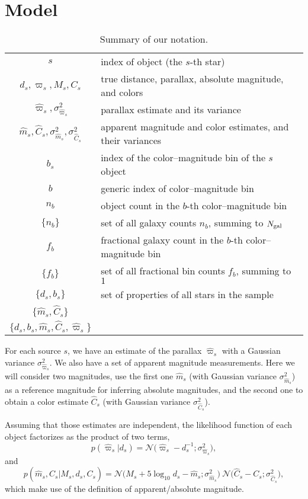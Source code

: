 \documentclass[aps,prd,showpacs,superscriptaddress,groupedaddress]{revtex4}  %
\newcommand{\equ}[1]{\begin{equation}#1\end{equation}}
\newcommand{\nobj}{{N_{\rm gal}}}
\begin{document}
\section{Model}


\begin{table} %
\centering
\begin{tabular}{cl}
\hline
$s$	&	index of object (the $s$-th star)\\
$d_s, \varpi_s, M_s, C_s$	&	true distance, parallax, absolute magnitude, and colors	\\
$\hat{\varpi}_s, \sigma_{\hat{\varpi}_s}^2$ 	&	parallax estimate and its variance\\
$\hat{m}_s, \hat{C}_s, \sigma^2_{\hat{m}_s}, \sigma^2_{\hat{C}_s}$ 	&	apparent magnitude and color estimates, and their variances\\
$b_s$	&	index of the color--magnitude bin of the $s$ object\\
\hline
$b$	&	generic index of color--magnitude bin\\
$n_b$	& 	object count in the $b$-th color--magnitude bin  \\
$\{n_b\}$	&	set of all galaxy counts $n_b$, summing to $\nobj$\\
$f_b$	&	fractional galaxy count in the $b$-th color--magnitude bin  \\
$\{f_b\}$	&	set of all fractional bin counts $f_b$, summing to $1$\\
$\{ d_s, b_s\}$	&	set of properties of all stars in the sample	\\
$\{ \hat{m}_s, \hat{C}_s \}$ &	\\
$\{ d_s, b_s, \hat{m}_s, \hat{C}_s, \hat{\varpi}_s \}$	 	&	\\
\hline
\end{tabular}
\caption{Summary of our notation. }
\label{tab:notation}
\end{table} 

For each source $s$, we have an estimate of the parallax $\hat{\varpi}_s$ with a Gaussian variance $\sigma_{\hat{\varpi}_s}^2$.
We also have a set of apparent magnitude measurements. 
Here we will consider two magnitudes, use the first one $\hat{m}_s$ (with Gaussian variance $\sigma_{\hat{m}_s}^2$) as a reference magnitude for inferring absolute magnitudes, and the second one to obtain a color estimate $\hat{C}_s$ (with Gaussian variance $\sigma_{\hat{C}_s}^2$).

Assuming that those estimates are independent, the likelihood function of each object factorizes as the product of two terms, 
\equ{
	p\left(\hat{\varpi}_s \bigr\rvert d_s\right) = \mathcal{N}\bigl(\hat{\varpi}_s - d_s^{-1};\sigma_{\hat{\varpi}_s}^2 \bigr),
}
and
\equ{
	p\left(\hat{m}_s, \hat{C}_s \bigr\rvert M_s, d_s, C_s\right)  =  \mathcal{N}\bigl( M_s + 5\log_{10}d_s  -\hat{m}_s ;\sigma_{\hat{m}_s}^2 \bigr) \  \mathcal{N}\bigl(\hat{C}_s - C_s;\sigma_{\hat{C}_s}^2 \bigr),
}
which make use of the definition of apparent/absolute magnitude.
\end{document}
